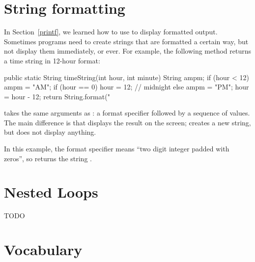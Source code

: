 \section{String formatting}


In Section~\ref{printf}, we learned how to use  to display formatted output.
Sometimes programs need to create strings that are formatted a certain way, but not display them immediately, or ever.
For example, the following method returns a time string in 12-hour format:

\begin{code}
public static String timeString(int hour, int minute) {
    String ampm;
    if (hour < 12) {
        ampm = "AM";
        if (hour == 0) {
            hour = 12;  // midnight
        }
    } else {
        ampm = "PM";
        hour = hour - 12;
    }
    return String.format("%
}
\end{code}


 takes the same arguments as : a format specifier followed by a sequence of values.
The main difference is that  displays the result on the screen;  creates a new string, but does not display anything.

In this example, the format specifier  means ``two digit integer padded with zeros'', so  returns the string .


\section{Nested Loops}

TODO


\section{Vocabulary}

